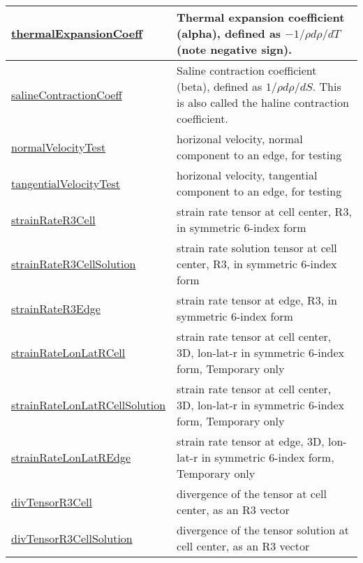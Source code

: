 {\begin{center}
\begin{longtable}{| p{2.0in} | p{4.0in} |}
    \hline
    \hyperref[subsec:var_sec_scratch_thermalExpansionCoeff]{thermalExpansionCoeff} & Thermal expansion coefficient (alpha), defined as $-1/\rho d\rho/dT$ (note negative sign). \\
    \hline
    \hyperref[subsec:var_sec_scratch_salineContractionCoeff]{salineContractionCoeff} & Saline contraction coefficient (beta), defined as $1/\rho d\rho/dS$. This is also called the haline contraction coefficient. \\
    \hline
    \hyperref[subsec:var_sec_scratch_normalVelocityTest]{normalVelocityTest} & horizonal velocity, normal component to an edge, for testing \\
    \hline
    \hyperref[subsec:var_sec_scratch_tangentialVelocityTest]{tangentialVelocityTest} & horizonal velocity, tangential component to an edge, for testing \\
    \hline
    \hyperref[subsec:var_sec_scratch_strainRateR3Cell]{strainRateR3Cell} & strain rate tensor at cell center, R3, in symmetric 6-index form \\
    \hline
    \hyperref[subsec:var_sec_scratch_strainRateR3CellSolution]{strainRateR3CellSolution} & strain rate solution tensor at cell center, R3, in symmetric 6-index form \\
    \hline
    \hyperref[subsec:var_sec_scratch_strainRateR3Edge]{strainRateR3Edge} & strain rate tensor at edge, R3, in symmetric 6-index form \\
    \hline
    \hyperref[subsec:var_sec_scratch_strainRateLonLatRCell]{strainRateLonLatRCell} & strain rate tensor at cell center, 3D, lon-lat-r in symmetric 6-index form, {\color{red}Temporary only} \\
    \hline
    \hyperref[subsec:var_sec_scratch_strainRateLonLatRCellSolution]{strainRateLonLatRCellSolution} & strain rate tensor at cell center, 3D, lon-lat-r in symmetric 6-index form, {\color{red}Temporary only} \\
    \hline
    \hyperref[subsec:var_sec_scratch_strainRateLonLatREdge]{strainRateLonLatREdge} & strain rate tensor at edge, 3D, lon-lat-r in symmetric 6-index form, {\color{red}Temporary only} \\
    \hline
    \hyperref[subsec:var_sec_scratch_divTensorR3Cell]{divTensorR3Cell} & divergence of the tensor at cell center, as an R3 vector \\
    \hline
    \hyperref[subsec:var_sec_scratch_divTensorR3CellSolution]{divTensorR3CellSolution} & divergence of the tensor solution at cell center, as an R3 vector \\

\end{longtable}
\end{center}}
